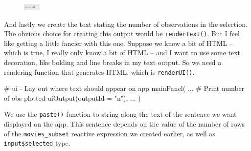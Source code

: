 \documentclass[
  letterpaper,
  DIV=11,
  numbers=noendperiod]{scrreprt}
\newenvironment{Shaded}{\begin{snugshade}}{\end{snugshade}}
\newcommand{\AttributeTok}[1]{\textcolor[rgb]{0.40,0.46,0.14}{#1}}
\newcommand{\CommentTok}[1]{\textcolor[rgb]{0.37,0.37,0.37}{#1}}
\newcommand{\FunctionTok}[1]{\textcolor[rgb]{0.28,0.35,0.67}{#1}}
\newcommand{\NormalTok}[1]{\textcolor[rgb]{0.00,0.46,0.62}{#1}}
\newcommand{\OtherTok}[1]{\textcolor[rgb]{0.00,0.46,0.62}{#1}}
\newcommand{\SpecialCharTok}[1]{\textcolor[rgb]{0.37,0.37,0.37}{#1}}
\newcommand{\StringTok}[1]{\textcolor[rgb]{0.13,0.47,0.30}{#1}}
\begin{document}
\begin{figure}

\includegraphics[width=0.1\textwidth,height=\textheight]{./images/output.png} \hfill{}

\end{figure}

And lastly we create the text stating the number of observations in the
selection. The obvious choice for creating this output would be
\texttt{renderText()}. But I feel like getting a little fancier with
this one. Suppose we know a bit of HTML -- which is true, I really only
know a bit of HTML -- and I want to use some text decoration, like
bolding and line breaks in my text output. So we need a rendering
function that generates HTML, which is \texttt{renderUI()}.

\begin{Shaded}
\begin{Highlighting}[]
\CommentTok{\# ui {-} Lay out where text should appear on app}
\FunctionTok{mainPanel}\NormalTok{( }
\NormalTok{  ...}
  \CommentTok{\# Print number of obs plotted}
  \FunctionTok{uiOutput}\NormalTok{(}\AttributeTok{outputId =} \StringTok{"n"}\NormalTok{), }
\NormalTok{  ...}
\NormalTok{)}
\end{Highlighting}
\end{Shaded}

\begin{Shaded}
\end{Shaded}

We use the \texttt{paste()} function to string along the text of the
sentence we want displayed on the app. This sentence depends on the
value of the number of rows of the \texttt{movies\_subset} reactive
expression we created earlier, as well as \texttt{input\$selected} type.
\end{document}
